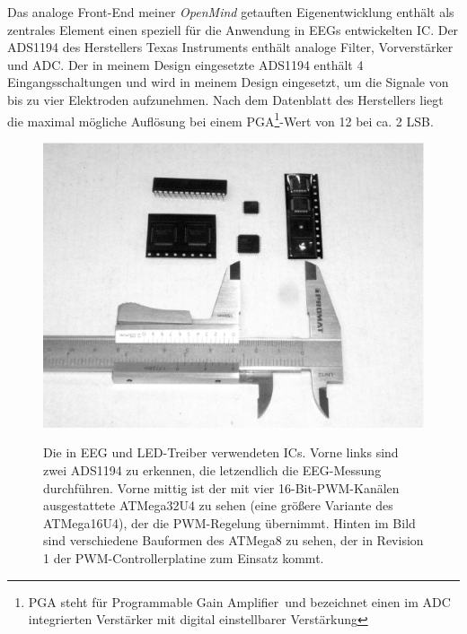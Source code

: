 \documentclass[12pt,a4paper,notitlepage]{article}
\newcommand{\annot}[1]{\textcolor{red}{#1}}
\begin{document}
\newglossaryentry{LSB}{name={LSB}, description={\annot{FIXME}}}
Das analoge Front-End meiner \emph{OpenMind} getauften Eigenentwicklung enthält als zentrales Element einen speziell für die Anwendung in \glspl{EEG} entwickelten \gls{IC}. Der ADS1194 des Herstellers Texas Instruments enthält analoge Filter, Vorverstärker und ADC\cite{TEXAS1}. Der in meinem Design eingesetzte ADS1194 enthält 4 Eingangsschaltungen und wird in meinem Design eingesetzt, um die Signale von bis zu vier Elektroden aufzunehmen. Nach dem Datenblatt des Herstellers liegt die maximal mögliche Auflösung bei einem PGA\footnote{PGA steht für \glqq Programmable Gain Amplifier\grqq\ und bezeichnet einen im ADC integrierten Verstärker mit digital einstellbarer Verstärkung}-Wert von 12 bei ca. 2 \gls{LSB}\cite{TEXAS1}.

\begin{figure}
\centering
\includegraphics[width=15cm]{images/chips_smaller.eps}
\label{ics_used}
\caption{Die in EEG und LED-Treiber verwendeten ICs. Vorne links sind zwei ADS1194 zu erkennen, die letzendlich die EEG-Messung durchführen. Vorne mittig ist der mit vier 16-Bit-PWM-Kanälen ausgestattete ATMega32U4 zu sehen (eine größere Variante des ATMega16U4), der die PWM-Regelung übernimmt. Hinten im Bild sind verschiedene Bauformen des ATMega8 zu sehen, der in Revision 1 der PWM-Controllerplatine zum Einsatz kommt.}
\end{figure}
\end{document}
